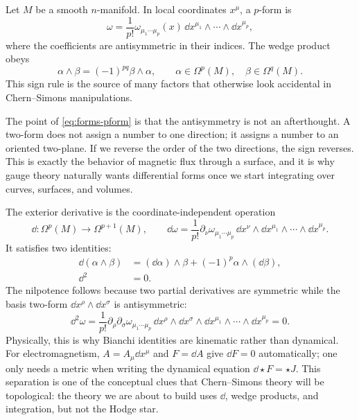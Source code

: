 Let $M$ be a smooth $n$-manifold. In local coordinates $x^\mu$, a $p$-form is
\begin{equation}
  \omega
  =
  \frac{1}{p!}\omega_{\mu_1\cdots\mu_p}(x)
  \,\dd x^{\mu_1}\wedge\cdots\wedge \dd x^{\mu_p},
  \label{eq:forms-pform}
\end{equation}
where the coefficients are antisymmetric in their indices. The wedge product obeys
\begin{equation}
  \alpha\wedge\beta
  =
  (-1)^{pq}\beta\wedge\alpha,
  \qquad
  \alpha\in\Omega^p(M),\quad \beta\in\Omega^q(M).
  \label{eq:forms-graded-comm}
\end{equation}
This sign rule is the source of many factors that otherwise look accidental in Chern--Simons manipulations.

The point of \eqref{eq:forms-pform} is that the antisymmetry is not an afterthought. A two-form does not assign a number to one direction; it assigns a number to an oriented two-plane. If we reverse the order of the two directions, the sign reverses. This is exactly the behavior of magnetic flux through a surface, and it is why gauge theory naturally wants differential forms once we start integrating over curves, surfaces, and volumes.

The exterior derivative is the coordinate-independent operation
\begin{equation}
  \dd:\Omega^p(M)\longrightarrow \Omega^{p+1}(M),
  \qquad
  \dd\omega
  =
  \frac{1}{p!}\partial_\nu \omega_{\mu_1\cdots\mu_p}
  \,\dd x^\nu\wedge \dd x^{\mu_1}\wedge\cdots\wedge \dd x^{\mu_p}.
  \label{eq:forms-exterior-derivative}
\end{equation}
It satisfies two identities:
\begin{align}
  \dd(\alpha\wedge\beta)
  &=
  (\dd\alpha)\wedge\beta
  +
  (-1)^p\alpha\wedge(\dd\beta),
  \label{eq:forms-leibniz}
  \\
  \dd^2&=0.
  \label{eq:forms-nilpotent}
\end{align}
The nilpotence follows because two partial derivatives are symmetric while the basis two-form $\dd x^\rho\wedge\dd x^\sigma$ is antisymmetric:
\begin{equation}
  \dd^2\omega
  =
  \frac{1}{p!}
  \partial_\rho\partial_\sigma\omega_{\mu_1\cdots\mu_p}
  \,\dd x^\rho\wedge\dd x^\sigma
  \wedge\dd x^{\mu_1}\wedge\cdots\wedge\dd x^{\mu_p}
  =
  0.
  \label{eq:forms-ddzero-proof}
\end{equation}
Physically, this is why Bianchi identities are kinematic rather than dynamical. For electromagnetism, $A=A_\mu\dd x^\mu$ and $F=\dd A$ give $\dd F=0$ automatically; one only needs a metric when writing the dynamical equation $\dd\star F=\star J$. This separation is one of the conceptual clues that Chern--Simons theory will be topological: the theory we are about to build uses $\dd$, wedge products, and integration, but not the Hodge star.

